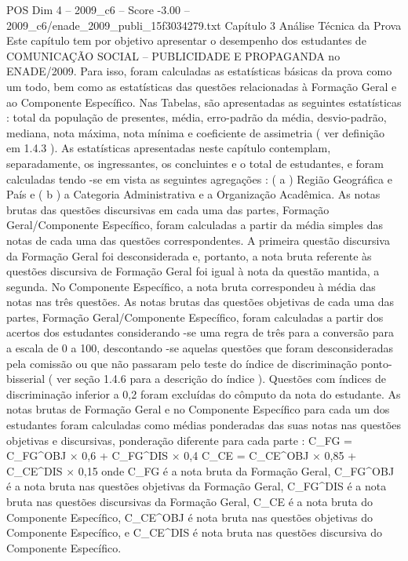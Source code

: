 \begin{textsample}{POS Dim 4 – 2009\_c6 – Score -3.00 – 2009\_c6/enade\_2009\_publi\_15f3034279.txt}  \label{ex:f4_pos_326}
Capítulo 3 Análise Técnica da Prova Este capítulo tem por objetivo apresentar o desempenho dos estudantes de COMUNICAÇÃO SOCIAL – PUBLICIDADE E PROPAGANDA no ENADE/2009.
Para isso, foram calculadas as estatísticas básicas da prova como um todo, bem como as estatísticas das questões relacionadas à Formação Geral e ao Componente Específico.
Nas Tabelas, são apresentadas as seguintes estatísticas : total da população de presentes, média, erro-padrão da média, desvio-padrão, mediana, nota máxima, nota mínima e coeficiente de assimetria ( ver definição em 1.4.3 ).
As estatísticas apresentadas neste capítulo contemplam, separadamente, os ingressantes, os concluintes e o total de estudantes, e foram calculadas tendo -se em vista as seguintes agregações : ( a ) Região Geográfica e País e ( b ) a Categoria Administrativa e a Organização Acadêmica.
As notas brutas das questões discursivas em cada uma das partes, Formação Geral/Componente Específico, foram calculadas a partir da média simples das notas de cada uma das questões correspondentes.
A primeira questão discursiva da Formação Geral foi desconsiderada e, portanto, a nota bruta referente às questões discursiva de Formação Geral foi igual à nota da questão mantida, a segunda.
No Componente Específico, a nota bruta correspondeu à média das notas nas três questões.
As notas brutas das questões objetivas de cada uma das partes, Formação Geral/Componente Específico, foram calculadas a partir dos acertos dos estudantes considerando -se uma regra de três para a conversão para a escala de 0 a 100, descontando -se aquelas questões que foram desconsideradas pela comissão ou que não passaram pelo teste do índice de discriminação ponto-bisserial ( ver seção 1.4.6 para a descrição do índice ).
Questões com índices de discriminação inferior a 0,2 foram excluídas do cômputo da nota do estudante.
As notas brutas de Formação Geral e no Componente Específico para cada um dos estudantes foram calculadas como médias ponderadas das suas notas nas questões objetivas e discursivas, ponderação diferente para cada parte : C\_FG = C\_FG\textasciicircum{}OBJ × 0,6 + C\_FG\textasciicircum{}DIS × 0,4 C\_CE = C\_CE\textasciicircum{}OBJ × 0,85 + C\_CE\textasciicircum{}DIS × 0,15 onde C\_FG é a nota bruta da Formação Geral, C\_FG\textasciicircum{}OBJ é a nota bruta nas questões objetivas da Formação Geral, C\_FG\textasciicircum{}DIS é a nota bruta nas questões discursivas da Formação Geral, C\_CE é a nota bruta do Componente Específico, C\_CE\textasciicircum{}OBJ é nota bruta nas questões objetivas do Componente Específico, e C\_CE\textasciicircum{}DIS é nota bruta nas questões discursiva do Componente Específico.

\end{textsample}
